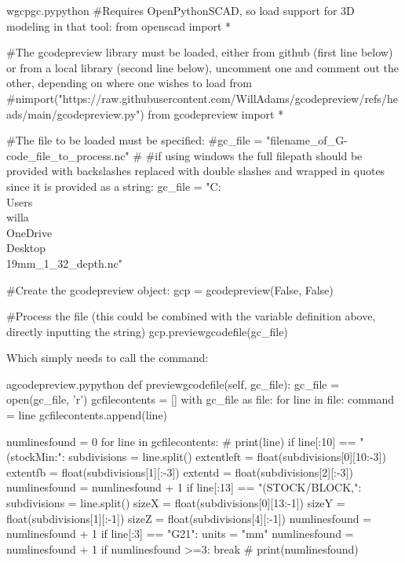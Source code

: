 \documentclass{ltxdoc}
\begin{document}
\lstset{firstnumber=1}%
\begin{writecode}{w}{gcpgc.py}{python}
#Requires OpenPythonSCAD, so load support for 3D modeling in that tool:
from openscad import *

#The gcodepreview library must be loaded, either from github (first line below) or from a local library (second line below), uncomment one and comment out the other, depending on where one wishes to load from
#nimport("https://raw.githubusercontent.com/WillAdams/gcodepreview/refs/heads/main/gcodepreview.py")
from gcodepreview import *

#The file to be loaded must be specified:
#gc_file = "filename_of_G-code_file_to_process.nc"
#
#if using windows the full filepath should be provided with backslashes replaced with double slashes and wrapped in quotes since it is provided as a string:
gc_file = "C:\\Users\\willa\\OneDrive\\Desktop\\19mm_1_32_depth.nc"

#Create the gcodepreview object:
gcp = gcodepreview(False, False)

#Process the file (this could be combined with the variable definition above, directly inputting the string)
gcp.previewgcodefile(gc_file)

\end{writecode}

\noindent Which simply needs to call the  command:

\lstset{firstnumber=\thegcpy}
\begin{writecode}{a}{gcodepreview.py}{python}
    def previewgcodefile(self, gc_file):
        gc_file = open(gc_file, 'r')
        gcfilecontents = []
        with gc_file as file:
            for line in file:
                command = line
                gcfilecontents.append(line)

        numlinesfound = 0
        for line in gcfilecontents:
#            print(line)
            if line[:10] == "(stockMin:":
                subdivisions = line.split()
                extentleft = float(subdivisions[0][10:-3])
                extentfb = float(subdivisions[1][:-3])
                extentd = float(subdivisions[2][:-3])
                numlinesfound = numlinesfound + 1
            if line[:13] == "(STOCK/BLOCK,":
                subdivisions = line.split()
                sizeX = float(subdivisions[0][13:-1])
                sizeY = float(subdivisions[1][:-1])
                sizeZ = float(subdivisions[4][:-1])
                numlinesfound = numlinesfound + 1
            if line[:3] == "G21":
                units = "mm"
                numlinesfound = numlinesfound + 1
            if numlinesfound >=3:
                break
#            print(numlinesfound)

\end{writecode}
\addtocounter{gcpy}{29}
\end{document}
